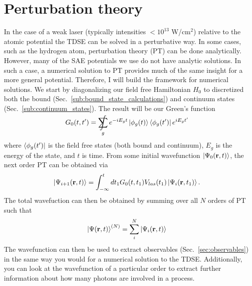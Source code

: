 \section{Perturbation theory} %
\label{sec:perturbation_theory}
In the case of a weak laser (typically intensities $<10^{13}$ W/cm$^2$) relative to the atomic potential the TDSE can be solved in a perturbative way. In some cases, such as the hydrogen atom, perturbation theory (PT) can be done analytically. However, many of the SAE potentials we use do not have analytic solutions. In such a case, a numerical solution to PT provides much of the same insight for a more general potential. Therefore, I will build the framework for numerical solutions. We start by diagonalizing our field free Hamiltonian $H_0$ to discretized both the bound (Sec.~\ref{sub:bound_state_calculations}) and continuum states (Sec.~\ref{sub:continuum_states}). The result will be our Green's function 
\begin{equation}
\label{eq:pt_green_func}
    G_0(t,t') = \SumInt_g e^{-iE_g t}\ket{\phi_g(t)}\bra{\phi_g(t')} e^{iE_g t'}
\end{equation}
where $\bra{\phi_g(t')}$ is the field free states (both bound and continuum), $E_g$ is the energy of the state, and $t$ is time. From some initial wavefunction $\ket{\Psi_0(\mathbf{r},t)}$, the next order PT can be obtained via
\begin{equation}
    \ket{\Psi_{i+1}(\mathbf{r},t)} = \int_{-\infty}^t dt_1 G_0(t,t_1)V_{las}(t_1)\ket{\Psi_i(\mathbf{r},t_1)}.
\end{equation}
The total wavefuction can then be obtained by summing over all $N$ orders of PT such that 
\begin{equation}
    \ket{\Psi(\mathbf{r},t)}^{(N)} = \sum_i^N \ket{\Psi_{i}(\mathbf{r},t)}
\end{equation}
The wavefunction can then be used to extract observables (Sec.~\ref{sec:observables}) in the same way you would for a numerical solution to the TDSE. Additionally, you can look at the wavefunction of a particular order to extract further information about how many photons are involved in a process. 


